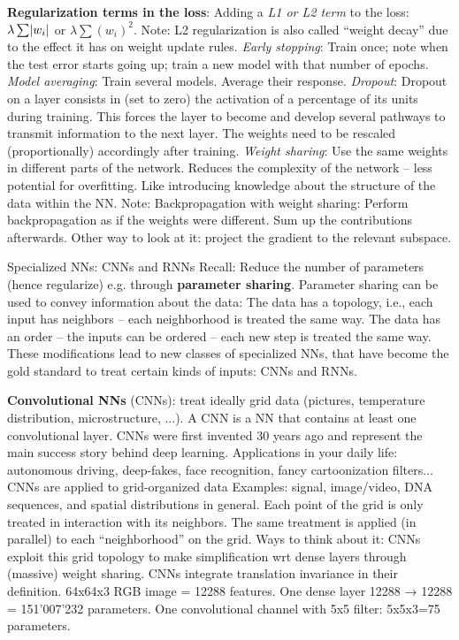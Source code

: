 \textbf{Regularization terms in the loss}:
Adding a \textit{L1 or L2 term} to the loss: $\lambda\sum \lvert w_i \rvert$ or $\lambda \sum (w_i)^2$.
Note: L2 regularization is also called “weight decay” due to the effect it has on weight update rules.
\textit{Early stopping}:
Train once; note when the test error starts going up; train a new model with that number of epochs.
\textit{Model averaging}:
Train several models. Average their response.
\textit{Dropout}:
Dropout on a layer consists in  (set to zero) the activation of a percentage of its units during training. 
This forces the layer to become  and develop several pathways to transmit information to the next layer.
The weights need to be rescaled (proportionally) accordingly after training.
\textit{Weight sharing}:
Use the same weights in different parts of the network.
Reduces the complexity of the network – less potential for overfitting.
Like introducing knowledge about the structure of the data within the NN. 
Note: Backpropagation with weight sharing: 
Perform backpropagation as if the weights were different.
Sum up the contributions afterwards.
Other way to look at it: project the gradient to the relevant subspace.

Specialized NNs: CNNs and RNNs Recall:
Reduce the number of parameters (hence regularize) e.g. through \textbf{parameter sharing}.
Parameter sharing can be used to convey information about the data:
The data has a topology, i.e., each input has neighbors – each neighborhood is treated the same way. The data has an order – the inputs can be ordered – each new step is treated the same way.
These modifications lead to new classes of specialized NNs, that have become the gold standard to treat certain kinds of inputs: CNNs and RNNs.

\textbf{Convolutional NNs} (CNNs):
treat ideally grid data (pictures, temperature distribution, microstructure, ...).
A CNN is a NN that contains at least one convolutional layer.
CNNs were first invented 30 years ago and represent the main success story behind deep learning. Applications in your daily life: autonomous driving, deep-fakes, face recognition, fancy cartoonization filters...
CNNs are applied to grid-organized data
Examples: signal, image/video, DNA sequences, and spatial distributions in general. 
Each point of the grid is only treated in interaction with its neighbors.
The same treatment is applied (in parallel) to each “neighborhood” on the grid.
Ways to think about it:
CNNs exploit this grid topology to make simplification wrt dense layers through (massive) weight sharing. CNNs integrate translation invariance in their definition.
64x64x3 RGB image = 12288 features.
One dense layer 12288 → 12288 = 151’007’232 parameters.
One convolutional channel with 5x5 filter: 5x5x3=75 parameters.

